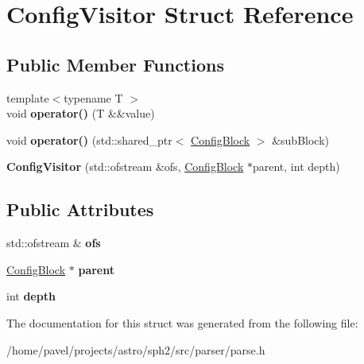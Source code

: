 \hypertarget{structConfigVisitor}{}\section{Config\+Visitor Struct Reference}
\label{structConfigVisitor}
\subsection*{Public Member Functions}
\begin{DoxyCompactItemize}
\item 
\hypertarget{structConfigVisitor_a83ebb8de13b12b6c7455975c60c0a50c}{}\label{structConfigVisitor_a83ebb8de13b12b6c7455975c60c0a50c} 
{\footnotesize template$<$typename T $>$ }\\void {\bfseries operator()} (T \&\&value)
\item 
\hypertarget{structConfigVisitor_a976934913e7993d15131c503d753a30b}{}\label{structConfigVisitor_a976934913e7993d15131c503d753a30b} 
void {\bfseries operator()} (std\+::shared\+\_\+ptr$<$ \hyperlink{classConfigBlock}{Config\+Block} $>$ \&sub\+Block)
\item 
\hypertarget{structConfigVisitor_a43ea135adb36aeccf57e12b7ef18bcc3}{}\label{structConfigVisitor_a43ea135adb36aeccf57e12b7ef18bcc3} 
{\bfseries Config\+Visitor} (std\+::ofstream \&ofs, \hyperlink{classConfigBlock}{Config\+Block} $\ast$parent, int depth)
\end{DoxyCompactItemize}
\subsection*{Public Attributes}
\begin{DoxyCompactItemize}
\item 
\hypertarget{structConfigVisitor_a641d48a6c2b982acec6c09156605e1ee}{}\label{structConfigVisitor_a641d48a6c2b982acec6c09156605e1ee} 
std\+::ofstream \& {\bfseries ofs}
\item 
\hypertarget{structConfigVisitor_a058be8370eed8587f90cbe6c5fc64549}{}\label{structConfigVisitor_a058be8370eed8587f90cbe6c5fc64549} 
\hyperlink{classConfigBlock}{Config\+Block} $\ast$ {\bfseries parent}
\item 
\hypertarget{structConfigVisitor_aa45d134c8e26ad6b011d46751d90e1bf}{}\label{structConfigVisitor_aa45d134c8e26ad6b011d46751d90e1bf} 
int {\bfseries depth}
\end{DoxyCompactItemize}


The documentation for this struct was generated from the following file\+:\begin{DoxyCompactItemize}
\item 
/home/pavel/projects/astro/sph2/src/parser/parse.\+h\end{DoxyCompactItemize}
